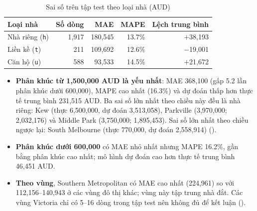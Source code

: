 \begin{table}[H]
\centering
\caption{Sai số trên tập test theo loại nhà (AUD)}\label{tab:saiso-loai}
\small
\begin{tabular}{@{}l r r r r@{}}
\toprule
Loại nhà & Số dòng & MAE & MAPE & Lệch trung bình \\
\midrule
Nhà riêng (\texttt{h}) & 1,917 & 180,545 & 13.7\% & $+$38,193 \\
Liền kề (\texttt{t}) & 211 & 109,692 & 12.6\% & $-$19,001 \\
Căn hộ (\texttt{u}) & 588 & 93,533 & 14.5\% & $+$21,672 \\
\bottomrule
\end{tabular}
\end{table}

\begin{itemize}[nosep]
  \item \textbf{Phân khúc từ 1,500,000 AUD là yếu nhất}: MAE 368,100 (gấp 5.2 lần phân khúc dưới 600,000), MAPE cao nhất (16.3\%) và dự đoán thấp hơn thực tế trung bình 231,515 AUD. Ba sai số lớn nhất theo chiều này đều là nhà riêng: Kew (thực 6,500,000, dự đoán 3,513,058), Parkville (3,970,000; 2,032,176) và Middle Park (3,750,000; 1,895,453). Sai số lớn nhất theo chiều ngược lại: South Melbourne (thực 770,000, dự đoán 2,558,914) ().
  \item \textbf{Phân khúc dưới 600,000} có MAE nhỏ nhất nhưng MAPE 16.2\%, gần bằng phân khúc cao nhất; mô hình dự đoán cao hơn thực tế trung bình 46,451 AUD.
  \item \textbf{Theo vùng}, Southern Metropolitan có MAE cao nhất (224,961) so với 112,156--140,943 ở các vùng đô thị khác; vùng này tập trung nhà đắt. Các vùng Victoria chỉ có 5--16 dòng trong tập test nên không đủ để kết luận ().
\end{itemize}

